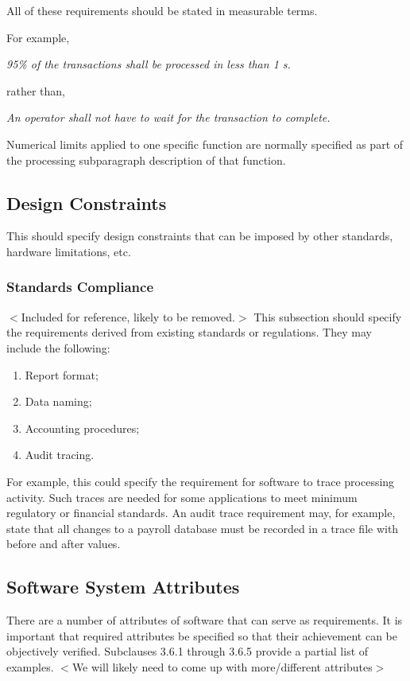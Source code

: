 \documentclass[draftclsnofoot,onecolumn,10pt]{IEEEtran}
\begin{document}
All of these requirements should be stated in measurable terms.

For example,

\textit{95\% of the transactions shall be processed in less than 1 s.}

rather than,

\textit{An operator shall not have to wait for the transaction to complete.}

Numerical limits applied to one specific function are normally specified as part
of the processing subparagraph description of that function.

\subsection{Design Constraints}
This should specify design constraints that can be imposed by other standards,
hardware limitations, etc.

\subsubsection{Standards Compliance}
$<$Included for reference, likely to be removed.$>$
This subsection should specify the requirements derived from existing standards
or regulations. They may include the following:

\begin{enumerate}
	\item Report format;
	\item Data naming;
	\item Accounting procedures;
	\item Audit tracing.
\end{enumerate}

For example, this could specify the requirement for software to trace processing
activity. Such traces are needed for some applications to meet minimum
regulatory or financial standards. An audit trace requirement may, for example,
state that all changes to a payroll database must be recorded in a trace file
with before and after values.

\subsection{Software System Attributes}
There are a number of attributes of software that can serve as requirements. It
is important that required attributes be specified so that their achievement can
be objectively verified. Subclauses 3.6.1 through 3.6.5 provide a partial list
of examples.
$<$We will likely need to come up with more/different attributes$>$
\end{document}
